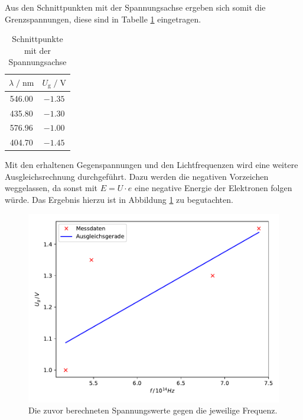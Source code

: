 Aus den Schnittpunkten mit der Spannungsachse ergeben sich somit die Grenzspannungen, 
diese sind in Tabelle \ref{tab:gegen} eingetragen. 

\begin{table}
    \centering
    \caption{Schnittpunkte mit der Spannungsachse}
    \label{tab:gegen}
    \begin{tabular}{c c}
    \toprule
    $ \lambda \;/\; \si{\nano\meter} $ & $U_\text{g} \;/\; \si{\volt}$\\
    \midrule 
      546.00 & $\num{-1.35}$\\ %
      435.80 & $\num{-1.30}$\\ %
      576.96 & $\num{-1.00}$\\ %
      404.70 & $\num{-1.45}$\\ %
    \bottomrule
    \end{tabular}
\end{table}

Mit den erhaltenen Gegenspannungen und den Lichtfrequenzen wird eine weitere Ausgleichsrechnung 
durchgeführt. Dazu werden die negativen Vorzeichen weggelassen, da sonst mit $E = U\cdot e$ eine 
negative Energie der Elektronen folgen würde. Das Ergebnis hierzu ist in Abbildung \ref{fig:plot2} zu 
begutachten. 

\begin{figure}
  \centering
  \includegraphics{content/plot2.pdf}
  \caption{Die zuvor berechneten Spannungswerte gegen die jeweilige Frequenz.}
  \label{fig:plot2}
\end{figure}


